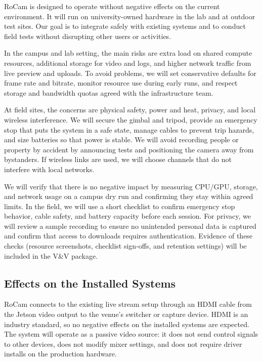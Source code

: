 \documentclass[12pt]{article}
\begin{document}
RoCam is designed to operate without negative effects on the current
environment. It will run on university-owned hardware in the lab and at outdoor
test sites. Our goal is to integrate safely with existing systems and to
conduct field tests without disrupting other users or activities.

In the campus and lab setting, the main risks are extra load on shared compute
resources, additional storage for video and logs, and higher network traffic
from live preview and uploads. To avoid problems, we will set conservative
defaults for frame rate and bitrate, monitor resource use during early runs,
and respect storage and bandwidth quotas agreed with the infrastructure team.

At field sites, the concerns are physical safety, power and heat, privacy, and
local wireless interference. We will secure the gimbal and tripod, provide an
emergency stop that puts the system in a safe state, manage cables to prevent
trip hazards, and size batteries so that power is stable. We will avoid
recording people or property by accident by announcing tests and positioning
the camera away from bystanders. If wireless links are used, we will choose
channels that do not interfere with local networks.

We will verify that there is no negative impact by measuring CPU/GPU, storage,
and network usage on a campus dry run and confirming they stay within agreed
limits. In the field, we will use a short checklist to confirm emergency stop
behavior, cable safety, and battery capacity before each session. For privacy,
we will review a sample recording to ensure no unintended personal data is
captured and confirm that access to downloads requires authentication. Evidence
of these checks (resource screenshots, checklist sign-offs, and retention
settings) will be included in the V\&V package.

\subsection{Effects on the Installed Systems}

RoCam connects to the existing live stream setup through an HDMI cable from the
Jetson video output to the venue’s switcher or capture device. HDMI is an
industry standard, so no negative effects on the installed systems are
expected. The system will operate as a passive video source: it does not send
control signals to other devices, does not modify mixer settings, and does not
require driver installs on the production hardware.
\end{document}
